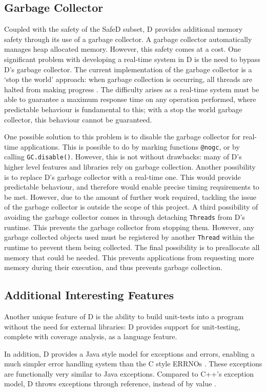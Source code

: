 \subsection{Garbage Collector}
Coupled with the safety of the SafeD subset, D provides additional memory
safety through its use of a garbage collector. A garbage collector
automatically manages heap allocated memory. 
However, this safety comes at a cost. One significant problem with developing a 
real-time system in D is the need to bypass D's garbage collector. 
The current implementation of the garbage 
collector is a `stop the world' approach: when garbage collection is occurring, 
all threads are halted from making progress 
\cite{dlang-garbage}. The difficulty arises as a real-time system must be able
to guarantee a maximum response time on any operation performed, 
where predictable behaviour is fundamental to this; 
with a stop the world garbage collector, this behaviour cannot be guaranteed. 
\par\bigskip\noindent
One possible solution to this problem is to disable the garbage collector for 
real-time applications. This is possible to do by marking functions \texttt{@nogc}, 
or by calling \texttt{GC.disable()}. However, this is not without drawbacks: 
many of D's higher level features and libraries rely on garbage collection. 
Another possibility is to replace D's garbage collector with a real-time 
one. This would provide predictable behaviour, and therefore
would enable precise timing requirements to be met.
However, due to the amount of further work required, tackling the issue of the garbage 
collector is outside the scope of this project.
A third possibility of avoiding the garbage collector comes in through
detaching \texttt{Threads} from D's runtime. This prevents the garbage collector from
stopping them. However, any garbage collected objects used must be registered
by another \texttt{Thread} within the runtime to prevent them being collected. 
The final possibility is to preallocate all memory that could be needed. This 
prevents applications from requesting more memory during their execution, and 
thus prevents garbage collection. 

\subsection{Additional Interesting Features}
Another unique feature of D is the ability to build unit-tests into a 
program without the need for external libraries: D provides support for 
unit-testing, complete with coverage analysis, as a language feature. 
\par\bigskip\noindent
In addition, D provides a Java style model for exceptions and errors, enabling 
a much simpler error handling system than the C style ERRNOs 
\cite{ddili-book}. 
These exceptions are functionally very similar to Java exceptions. Compared to
C++'s exception model, D throws exceptions through reference, instead of by
value \cite{interface-to-cpp}. 

